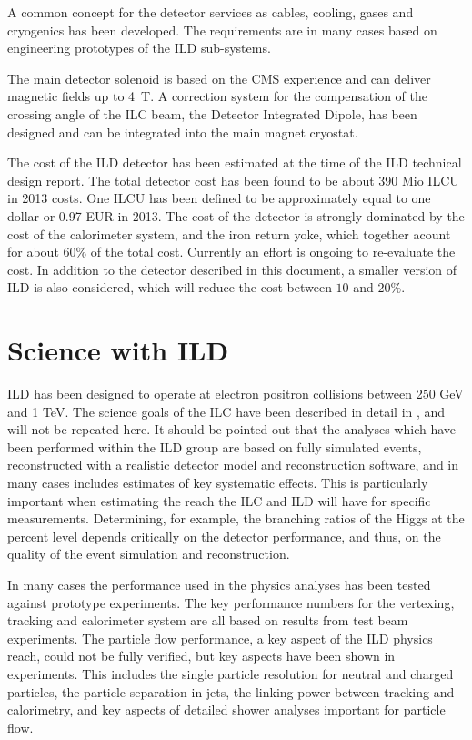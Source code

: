 \documentclass[%
 amsmath,amssymb,
 aps,
]{revtex4-1}
\begin{document}
A common concept for the detector services as cables, cooling, gases and cryogenics has been developed. The requirements are in many cases based on engineering prototypes of the ILD sub-systems. 

The main detector solenoid is based on the CMS experience and can deliver magnetic fields up to 4~T. A correction system for the compensation of the crossing angle of the ILC beam, the Detector Integrated Dipole, has been designed and can be integrated into the main magnet cryostat.

The cost of the ILD detector has been estimated at the time of the ILD technical design report. The total detector cost has been found to be about $390 $ Mio ILCU in 2013 costs. One ILCU has been defined to be approximately equal to one dollar or 0.97 EUR in 2013. The cost of the detector is strongly dominated by the cost of the calorimeter system, and the iron return yoke, which together acount for about $60\%$ of the total cost. Currently an effort is ongoing to re-evaluate the cost. In addition to the detector described in this document, a smaller version of ILD is also considered, which will reduce the cost between $10$ and $20\%$. 

\section{Science with ILD}
ILD has been designed to operate at electron positron collisions between 250 GeV and 1 TeV. The science goals of the ILC have been described in detail in \cite{ILCESU1}, and will not be repeated here. It should be pointed out that the analyses which have been performed within the ILD group are based on fully simulated events, reconstructed with a realistic detector model and reconstruction software, and in many cases includes estimates of key systematic effects. This is particularly important when estimating the reach the ILC and ILD will have for specific measurements. Determining, for example, the branching ratios of the Higgs at the percent level depends critically on the detector performance, and thus, on the quality of the event simulation and reconstruction. 

In many cases the performance used in the physics analyses has been tested against prototype experiments. The key performance numbers for the vertexing, tracking and calorimeter system are all based on results from test beam experiments. The particle flow performance, a key aspect of the ILD physics reach, could not be fully verified, but key aspects have been shown in experiments. This includes the single particle resolution for neutral and charged particles, the particle separation in jets, the linking power between tracking and calorimetry, and key aspects of detailed shower analyses important for particle flow. 
\end{document}
